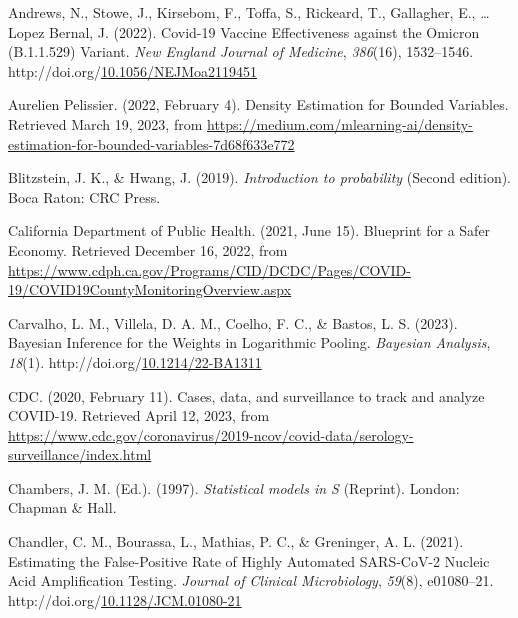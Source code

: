 \documentclass[12pt,twoside]{smiththesis}
\newlength{\cslhangindent}
\newenvironment{CSLReferences}[2] %
 {%
\setlength{\parindent}{0pt}
\ifodd #1 \everypar{\setlength{\hangindent}{\cslhangindent}}\ignorespaces\fi
\ifnum #2 > 0
\setlength{\parskip}{#2\baselineskip}
  \fi
}%
{}
\begin{document}
\hypertarget{refs}{}
\begin{CSLReferences}{1}{0}
\leavevmode{}%
Andrews, N., Stowe, J., Kirsebom, F., Toffa, S., Rickeard, T., Gallagher, E., \ldots{} Lopez Bernal, J. (2022). Covid-19 {Vaccine Effectiveness} against the {Omicron} ({B}.1.1.529) {Variant}. \emph{New England Journal of Medicine}, \emph{386}(16), 1532--1546. http://doi.org/\href{https://doi.org/10.1056/NEJMoa2119451}{10.1056/NEJMoa2119451}

\leavevmode{}%
Aurelien Pelissier. (2022, February 4). Density {Estimation} for {Bounded Variables}. Retrieved March 19, 2023, from \url{https://medium.com/mlearning-ai/density-estimation-for-bounded-variables-7d68f633e772}

\leavevmode{}%
Blitzstein, J. K., \& Hwang, J. (2019). \emph{Introduction to probability} (Second edition). {Boca Raton}: {CRC Press}.

\leavevmode{}%
California Department of Public Health. (2021, June 15). Blueprint for a {Safer Economy}. Retrieved December 16, 2022, from \url{https://www.cdph.ca.gov/Programs/CID/DCDC/Pages/COVID-19/COVID19CountyMonitoringOverview.aspx}

\leavevmode{}%
Carvalho, L. M., Villela, D. A. M., Coelho, F. C., \& Bastos, L. S. (2023). Bayesian {Inference} for the {Weights} in {Logarithmic Pooling}. \emph{Bayesian Analysis}, \emph{18}(1). http://doi.org/\href{https://doi.org/10.1214/22-BA1311}{10.1214/22-BA1311}

\leavevmode{}%
CDC. (2020, February 11). Cases, data, and surveillance to track and analyze {COVID-19}. Retrieved April 12, 2023, from \url{https://www.cdc.gov/coronavirus/2019-ncov/covid-data/serology-surveillance/index.html}

\leavevmode{}%
Chambers, J. M. (Ed.). (1997). \emph{Statistical models in {S}} (Reprint). {London}: {Chapman \& Hall}.

\leavevmode{}%
Chandler, C. M., Bourassa, L., Mathias, P. C., \& Greninger, A. L. (2021). Estimating the {False-Positive Rate} of {Highly Automated SARS-CoV-2 Nucleic Acid Amplification Testing}. \emph{Journal of Clinical Microbiology}, \emph{59}(8), e01080--21. http://doi.org/\href{https://doi.org/10.1128/JCM.01080-21}{10.1128/JCM.01080-21}


\end{CSLReferences}
\end{document}
